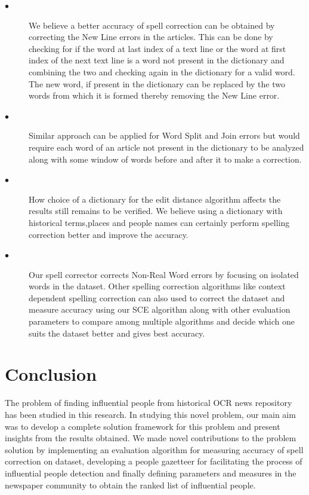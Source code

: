 \documentclass[letterpaper,11pt]{report}
\begin{document}
\begin{description}
\item[$\bullet$]\noindent
We believe a better accuracy of spell correction can be obtained by correcting the New Line errors in the articles. This can be done by checking for if the word at last index of a text line or the word at first index of the next text line is a word not present in the dictionary and combining the two and checking again in the dictionary for a valid word. The new word, if present in the dictionary can be replaced by the two words from which it is formed thereby removing the New Line error. 
\item[$\bullet$]\noindent Similar approach can be applied for Word Split and Join errors but would require each word of an article not present in the dictionary to be analyzed along with some window of words before and after it to make a correction. 
\item[$\bullet$]\noindent How choice of a dictionary for the edit distance algorithm affects the results still remains to be verified. We believe using a dictionary with historical terms,places and people names can certainly perform spelling correction better and improve the accuracy.
\item[$\bullet$] \noindent 
Our spell corrector corrects Non-Real Word errors by focusing on isolated words in the dataset. Other spelling correction algorithms like context dependent spelling correction can also used to correct the dataset and measure accuracy using our SCE algorithm along with other evaluation parameters to compare among multiple algorithms and decide which one suits the dataset better and gives best accuracy. 
\end{description}



 

 




\chapter{Conclusion}
\label{chapter:conclusion}

The problem of finding influential people from historical OCR news repository has been studied in this research. In studying this novel problem, our main aim was to develop a complete solution framework for this problem and present insights from the results obtained.
 We made novel contributions to the problem solution by implementing an evaluation algorithm for measuring accuracy of spell correction on dataset, developing a people gazetteer for facilitating the process of influential people detection and finally defining parameters and measures in the newspaper community to obtain the ranked list of influential people.
  
\end{document}
